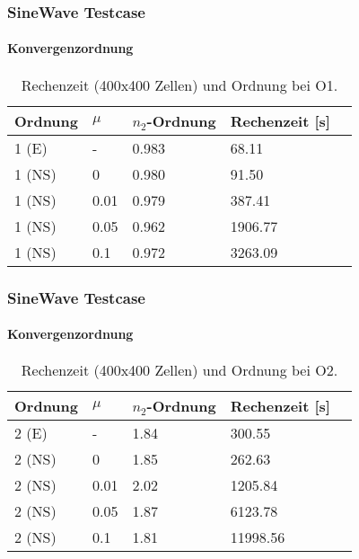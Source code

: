 \documentclass[
	11pt, %
	aspectratio=169, %
]{beamer}
\begin{document}



\begin{frame}
	\frametitle{SineWave Testcase}
	\framesubtitle{Konvergenzordnung}

		\begin{table}
			\begin{tabular}{l l l l l}
				\toprule
				Ordnung & $\mu$  & $n_2$-Ordnung & Rechenzeit [s]\\
				\midrule
				1 (E) & - & 0.983 & 68.11\\
				1 (NS) & 0 & 0.980 & 91.50\\
				1 (NS) & 0.01  & 0.979& 387.41\\
				1 (NS) & 0.05 &  0.962 & 1906.77\\
				1 (NS) & 0.1 &  0.972  & 3263.09\\
				\bottomrule
			\end{tabular}
			\caption{Rechenzeit (400x400 Zellen) und Ordnung bei O1. }
	\end{table}


\end{frame}



\begin{frame}
	\frametitle{SineWave Testcase}
	\framesubtitle{Konvergenzordnung}

		\begin{table}
			\begin{tabular}{l l l l l}
				\toprule
				Ordnung & $\mu$  & $n_2$-Ordnung & Rechenzeit [s]\\
				\midrule
				2 (E) & - & 1.84 & 300.55\\
				2 (NS) & 0 &  1.85 &262.63 \\
				2 (NS) & 0.01 &2.02 &1205.84 \\
				2 (NS) & 0.05  & 1.87& 6123.78 \\
				2 (NS) & 0.1 &  1.81& 11998.56\\
				\bottomrule
			\end{tabular}
			\caption{Rechenzeit (400x400 Zellen) und Ordnung bei O2. }
	\end{table}


\end{frame}
\end{document}
